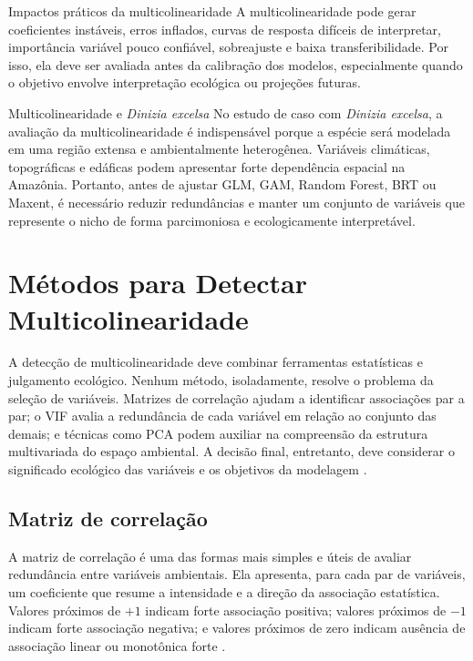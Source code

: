\begin{caixaatencao}{Impactos práticos da multicolinearidade}
	A multicolinearidade pode gerar coeficientes instáveis, erros inflados, curvas de resposta difíceis de interpretar, importância variável pouco confiável, sobreajuste e baixa transferibilidade. Por isso, ela deve ser avaliada antes da calibração dos modelos, especialmente quando o objetivo envolve interpretação ecológica ou projeções futuras.
\end{caixaatencao}

\begin{caixaaplicacao}{Multicolinearidade e \textit{Dinizia excelsa}}
	No estudo de caso com \textit{Dinizia excelsa}, a avaliação da multicolinearidade é indispensável porque a espécie será modelada em uma região extensa e ambientalmente heterogênea. Variáveis climáticas, topográficas e edáficas podem apresentar forte dependência espacial na Amazônia. Portanto, antes de ajustar GLM, GAM, Random Forest, BRT ou Maxent, é necessário reduzir redundâncias e manter um conjunto de variáveis que represente o nicho de forma parcimoniosa e ecologicamente interpretável.
\end{caixaaplicacao}

\section{Métodos para Detectar Multicolinearidade}

A detecção de multicolinearidade deve combinar ferramentas estatísticas e julgamento ecológico. Nenhum método, isoladamente, resolve o problema da seleção de variáveis. Matrizes de correlação ajudam a identificar associações par a par; o VIF avalia a redundância de cada variável em relação ao conjunto das demais; e técnicas como PCA podem auxiliar na compreensão da estrutura multivariada do espaço ambiental. A decisão final, entretanto, deve considerar o significado ecológico das variáveis e os objetivos da modelagem \parencite{dormann2013collinearity,guisan2017habitat}.

\subsection{Matriz de correlação}

A matriz de correlação é uma das formas mais simples e úteis de avaliar redundância entre variáveis ambientais. Ela apresenta, para cada par de variáveis, um coeficiente que resume a intensidade e a direção da associação estatística. Valores próximos de $+1$ indicam forte associação positiva; valores próximos de $-1$ indicam forte associação negativa; e valores próximos de zero indicam ausência de associação linear ou monotônica forte \parencite{dormann2013collinearity}.


